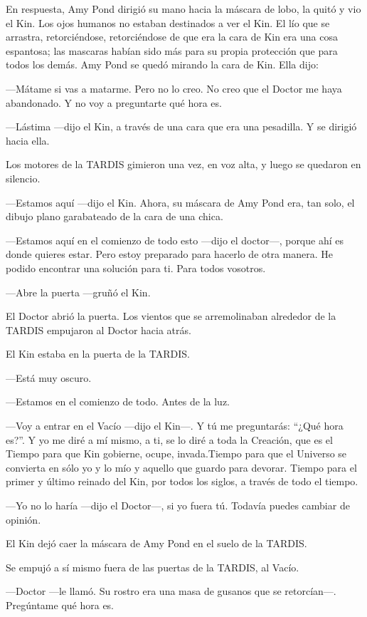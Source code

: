En respuesta, Amy Pond dirigió su mano hacia la máscara de lobo, la quitó y vio el Kin. Los ojos humanos no estaban destinados a ver el Kin. El lío que se arrastra, retorciéndose, retorciéndose de que era la cara de Kin era una cosa espantosa; las mascaras habían sido más para su propia protección que para todos los demás. Amy Pond se quedó mirando la cara de Kin. Ella dijo:

---Mátame si vas a matarme. Pero no lo creo. No creo que el Doctor me haya abandonado. Y no voy a preguntarte qué hora es.

---Lástima ---dijo el Kin, a través de una cara que era una pesadilla. Y se dirigió hacia ella.

Los motores de la TARDIS gimieron una vez, en voz alta, y luego se quedaron en silencio.

---Estamos aquí ---dijo el Kin. Ahora, su máscara de Amy Pond era, tan solo, el dibujo plano garabateado de la cara de una chica.

---Estamos aquí en el comienzo de todo esto ---dijo el doctor---, porque ahí es donde quieres estar. Pero estoy preparado para hacerlo de otra manera. He podido encontrar una solución para ti. Para todos vosotros.

---Abre la puerta ---gruñó el Kin.

El Doctor abrió la puerta. Los vientos que se arremolinaban alrededor de la TARDIS empujaron al Doctor hacia atrás.

El Kin estaba en la puerta de la TARDIS.

---Está muy oscuro.

---Estamos en el comienzo de todo. Antes de la luz.

---Voy a entrar en el Vacío ---dijo el Kin---. Y tú me preguntarás: ``¿Qué hora es?''. Y yo me diré a mí mismo, a ti, se lo diré a toda la Creación, que es el Tiempo para que Kin gobierne, ocupe, invada.Tiempo para que el Universo se convierta en sólo yo y lo mío y aquello que guardo para devorar. Tiempo para el primer y último reinado del Kin, por todos los siglos, a través de todo el tiempo.

---Yo no lo haría ---dijo el Doctor---, si yo fuera tú. Todavía puedes cambiar de opinión.

El Kin dejó caer la máscara de Amy Pond en el suelo de la TARDIS.

Se empujó a sí mismo fuera de las puertas de la TARDIS, al Vacío.

---Doctor ---le llamó. Su rostro era una masa de gusanos que se retorcían---. Pregúntame qué hora es.

